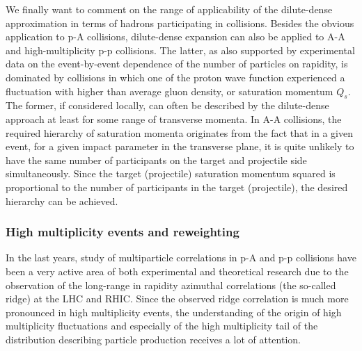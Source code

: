 We finally want to comment on the range of applicability  of the 
dilute-dense approximation in terms of hadrons participating in collisions. 
Besides the obvious application to p-A collisions, dilute-dense expansion 
can also be applied to A-A  and high-multiplicity p-p collisions. 
The latter, as also supported by experimental data on 
the event-by-event dependence of the number of particles on rapidity,   
is dominated by collisions in which one of the proton wave function experienced 
a fluctuation with higher than average gluon density, or saturation momentum $Q_s$. 
The former, if considered locally, can often be described by the 
dilute-dense approach at least for some range of transverse momenta. 
In A-A collisions, the required hierarchy of saturation momenta originates from 
the fact that in a given event, for a given impact parameter in the transverse plane, it is quite unlikely
to have the same number of participants on the target and projectile side simultaneously. 
Since the target (projectile) saturation momentum squared is proportional to the number 
of participants in the target (projectile), the desired hierarchy can be achieved.   




\subsubsection*{High multiplicity events and reweighting}
In the last years, study of multiparticle correlations in 
p-A and p-p collisions have been a very active 
area of both experimental and theoretical research 
due to the observation of the long-range in rapidity 
azimuthal correlations (the so-called ridge)
at the LHC and RHIC.   
Since the observed ridge correlation is much more pronounced in high multiplicity
events, the understanding of the origin of high multiplicity
fluctuations and especially of the high multiplicity tail of the distribution describing 
particle production  
receives a lot of attention. 

